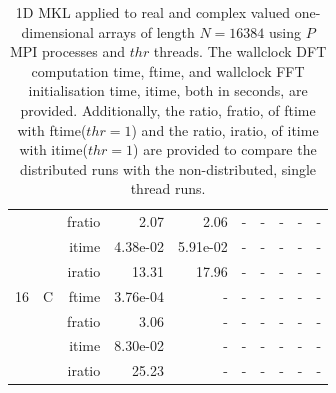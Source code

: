 \documentclass[a4paper]{article}
\begin{document}
\begin{table}[htbp]
\begin{center}
\begin{small}
\begin{tabular}{|r|r|r|r|r|r|r|r|r|r|}
          &      & fratio & 2.07 & 2.06 &     -     &     -     &     -     &     -     &     -     \\   
          &      & itime & 4.38e-02 & 5.91e-02 &     -     &     -     &     -     &     -     &     -     \\   
          &      & iratio & 13.31 & 17.96 &     -     &     -     &     -     &     -     &     -     \\ \hline 
     16 & C & ftime & 3.76e-04 &     -     &     -     &     -     &     -     &     -     &     -     \\   
          &      & fratio & 3.06 &     -     &     -     &     -     &     -     &     -     &     -     \\   
          &      & itime & 8.30e-02 &     -     &     -     &     -     &     -     &     -     &     -     \\   
          &      & iratio & 25.23 &     -     &     -     &     -     &     -     &     -     &     -     \\ \hline 
\end{tabular}
\caption{1D MKL applied to real and complex valued one-dimensional arrays of length $N=16384$ using $P$ MPI processes and $thr$ threads. The wallclock DFT computation time, ftime, and wallclock FFT initialisation time, itime, both in seconds, are provided. Additionally, the ratio, fratio, of ftime  with ftime($thr=1$) and the ratio, iratio, of itime  with itime($thr=1$) are provided to compare the distributed runs with the non-distributed, single thread runs.  }\label{TblMKL1d16384}
\end{small}
\end{center}
\end{table}
\end{document}
